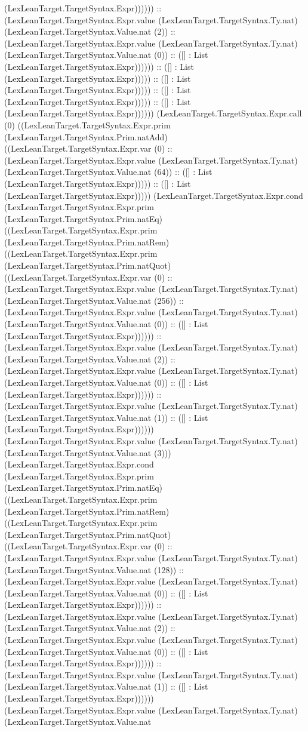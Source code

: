 \documentclass[11pt]{article}
\begin{document}
(LexLeanTarget.TargetSyntax.Expr)))))) :: (LexLeanTarget.TargetSyntax.Expr.value (LexLeanTarget.TargetSyntax.Ty.nat) (LexLeanTarget.TargetSyntax.Value.nat (2)) :: (LexLeanTarget.TargetSyntax.Expr.value (LexLeanTarget.TargetSyntax.Ty.nat) (LexLeanTarget.TargetSyntax.Value.nat (0)) :: ([] : List (LexLeanTarget.TargetSyntax.Expr)))))) :: ([] : List (LexLeanTarget.TargetSyntax.Expr))))) :: ([] : List (LexLeanTarget.TargetSyntax.Expr))))) :: ([] : List (LexLeanTarget.TargetSyntax.Expr))))) :: ([] : List (LexLeanTarget.TargetSyntax.Expr)))))) (LexLeanTarget.TargetSyntax.Expr.call (0) ((LexLeanTarget.TargetSyntax.Expr.prim (LexLeanTarget.TargetSyntax.Prim.natAdd) ((LexLeanTarget.TargetSyntax.Expr.var (0) :: (LexLeanTarget.TargetSyntax.Expr.value (LexLeanTarget.TargetSyntax.Ty.nat) (LexLeanTarget.TargetSyntax.Value.nat (64)) :: ([] : List (LexLeanTarget.TargetSyntax.Expr))))) :: ([] : List (LexLeanTarget.TargetSyntax.Expr))))) (LexLeanTarget.TargetSyntax.Expr.cond (LexLeanTarget.TargetSyntax.Expr.prim (LexLeanTarget.TargetSyntax.Prim.natEq) ((LexLeanTarget.TargetSyntax.Expr.prim (LexLeanTarget.TargetSyntax.Prim.natRem) ((LexLeanTarget.TargetSyntax.Expr.prim (LexLeanTarget.TargetSyntax.Prim.natQuot) ((LexLeanTarget.TargetSyntax.Expr.var (0) :: (LexLeanTarget.TargetSyntax.Expr.value (LexLeanTarget.TargetSyntax.Ty.nat) (LexLeanTarget.TargetSyntax.Value.nat (256)) :: (LexLeanTarget.TargetSyntax.Expr.value (LexLeanTarget.TargetSyntax.Ty.nat) (LexLeanTarget.TargetSyntax.Value.nat (0)) :: ([] : List (LexLeanTarget.TargetSyntax.Expr)))))) :: (LexLeanTarget.TargetSyntax.Expr.value (LexLeanTarget.TargetSyntax.Ty.nat) (LexLeanTarget.TargetSyntax.Value.nat (2)) :: (LexLeanTarget.TargetSyntax.Expr.value (LexLeanTarget.TargetSyntax.Ty.nat) (LexLeanTarget.TargetSyntax.Value.nat (0)) :: ([] : List (LexLeanTarget.TargetSyntax.Expr)))))) :: (LexLeanTarget.TargetSyntax.Expr.value (LexLeanTarget.TargetSyntax.Ty.nat) (LexLeanTarget.TargetSyntax.Value.nat (1)) :: ([] : List (LexLeanTarget.TargetSyntax.Expr)))))) (LexLeanTarget.TargetSyntax.Expr.value (LexLeanTarget.TargetSyntax.Ty.nat) (LexLeanTarget.TargetSyntax.Value.nat (3))) (LexLeanTarget.TargetSyntax.Expr.cond (LexLeanTarget.TargetSyntax.Expr.prim (LexLeanTarget.TargetSyntax.Prim.natEq) ((LexLeanTarget.TargetSyntax.Expr.prim (LexLeanTarget.TargetSyntax.Prim.natRem) ((LexLeanTarget.TargetSyntax.Expr.prim (LexLeanTarget.TargetSyntax.Prim.natQuot) ((LexLeanTarget.TargetSyntax.Expr.var (0) :: (LexLeanTarget.TargetSyntax.Expr.value (LexLeanTarget.TargetSyntax.Ty.nat) (LexLeanTarget.TargetSyntax.Value.nat (128)) :: (LexLeanTarget.TargetSyntax.Expr.value (LexLeanTarget.TargetSyntax.Ty.nat) (LexLeanTarget.TargetSyntax.Value.nat (0)) :: ([] : List (LexLeanTarget.TargetSyntax.Expr)))))) :: (LexLeanTarget.TargetSyntax.Expr.value (LexLeanTarget.TargetSyntax.Ty.nat) (LexLeanTarget.TargetSyntax.Value.nat (2)) :: (LexLeanTarget.TargetSyntax.Expr.value (LexLeanTarget.TargetSyntax.Ty.nat) (LexLeanTarget.TargetSyntax.Value.nat (0)) :: ([] : List (LexLeanTarget.TargetSyntax.Expr)))))) :: (LexLeanTarget.TargetSyntax.Expr.value (LexLeanTarget.TargetSyntax.Ty.nat) (LexLeanTarget.TargetSyntax.Value.nat (1)) :: ([] : List (LexLeanTarget.TargetSyntax.Expr)))))) (LexLeanTarget.TargetSyntax.Expr.value (LexLeanTarget.TargetSyntax.Ty.nat) (LexLeanTarget.TargetSyntax.Value.nat 
\end{document}
